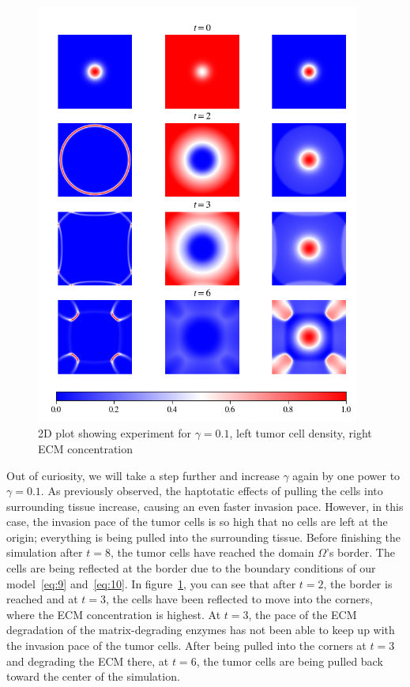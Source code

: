 \begin{figure}[h!]
 \centering
 \includegraphics[width=0.95\textwidth]{resources/images/gamma_2D_plot_.png}
 \caption{2D plot showing experiment for $\gamma=0.1$, left tumor cell density, right ECM concentration}
 \label{fig:gamma_2D_plot}
\end{figure}
Out of curiosity, we will take a step further and increase $\gamma$ again by one power to $\gamma=0.1$. As previously observed, the haptotatic effects of pulling the cells into surrounding tissue increase, causing an even faster invasion pace. However, in this case, the invasion pace of the tumor cells is so high that no cells are left at the origin; everything is being pulled into the surrounding tissue. Before finishing the simulation after $t=8$, the tumor cells have reached the domain $\Omega$'s border. The cells are being reflected at the border due to the boundary conditions of our model~\ref{eq:9} and~\ref{eq:10}. In figure~\ref{fig:gamma_2D_plot}, you can see that after $t=2$, the border is reached and at $t=3$, the cells have been reflected to move into the corners, where the ECM concentration is highest. At $t=3$, the pace of the ECM degradation of the matrix-degrading enzymes has not been able to keep up with the invasion pace of the tumor cells. After being pulled into the corners at $t=3$ and degrading the ECM there, at $t=6$, the tumor cells are being pulled back toward the center of the simulation.


